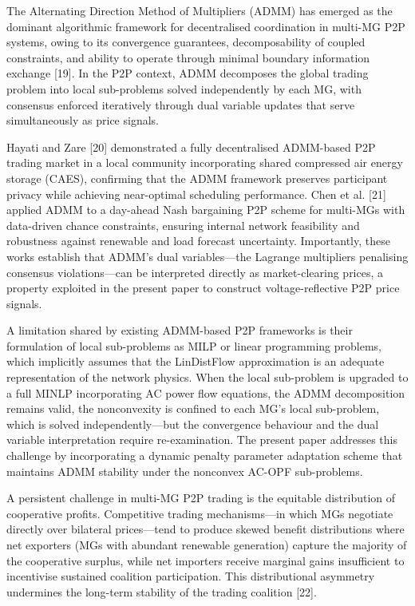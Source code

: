 \documentclass[preprint,12pt]{elsarticle}
\begin{document}
The Alternating Direction Method of Multipliers (ADMM) has emerged as the dominant algorithmic framework for decentralised coordination in multi-MG P2P systems, owing to its convergence guarantees, decomposability of coupled constraints, and ability to operate through minimal boundary information exchange [19]. In the P2P context, ADMM decomposes the global trading problem into local sub-problems solved independently by each MG, with consensus enforced iteratively through dual variable updates that serve simultaneously as price signals.

Hayati and Zare [20] demonstrated a fully decentralised ADMM-based P2P trading market in a local community incorporating shared compressed air energy storage (CAES), confirming that the ADMM framework preserves participant privacy while achieving near-optimal scheduling performance. Chen et al. [21] applied ADMM to a day-ahead Nash bargaining P2P scheme for multi-MGs with data-driven chance constraints, ensuring internal network feasibility and robustness against renewable and load forecast uncertainty. Importantly, these works establish that ADMM's dual variables—the Lagrange multipliers penalising consensus violations—can be interpreted directly as market-clearing prices, a property exploited in the present paper to construct voltage-reflective P2P price signals.

A limitation shared by existing ADMM-based P2P frameworks is their formulation of local sub-problems as MILP or linear programming problems, which implicitly assumes that the LinDistFlow approximation is an adequate representation of the network physics. When the local sub-problem is upgraded to a full MINLP incorporating AC power flow equations, the ADMM decomposition remains valid, the nonconvexity is confined to each MG's local sub-problem, which is solved independently—but the convergence behaviour and the dual variable interpretation require re-examination. The present paper addresses this challenge by incorporating a dynamic penalty parameter adaptation scheme that maintains ADMM stability under the nonconvex AC-OPF sub-problems.

A persistent challenge in multi-MG P2P trading is the equitable distribution of cooperative profits. Competitive trading mechanisms—in which MGs negotiate directly over bilateral prices—tend to produce skewed benefit distributions where net exporters (MGs with abundant renewable generation) capture the majority of the cooperative surplus, while net importers receive marginal gains insufficient to incentivise sustained coalition participation. This distributional asymmetry undermines the long-term stability of the trading coalition [22].
\end{document}
